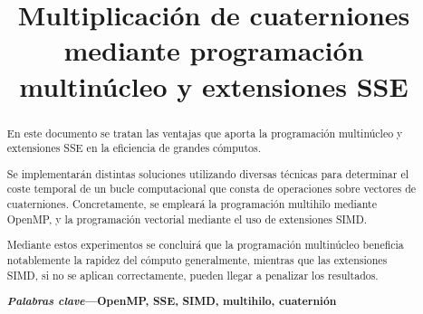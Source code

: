 \documentclass[conference]{IEEEtran}
\begin{document}
\def\UrlBreaks{\do\/\do-\do\_} %

\title{Multiplicación de cuaterniones mediante programación multinúcleo y extensiones SSE\\
}

\author{
\and
{}
}

\maketitle

\thispagestyle{plain}
\pagestyle{plain}

\begin{abstract}
En este documento se tratan las ventajas que aporta la programación multinúcleo y extensiones SSE en la eficiencia de grandes cómputos.

Se implementarán distintas soluciones utilizando diversas técnicas para determinar el coste temporal de un bucle computacional que consta de operaciones sobre vectores de cuaterniones. Concretamente, se empleará la programación multihilo mediante OpenMP, y la programación vectorial mediante el uso de extensiones SIMD.

Mediante estos experimentos se concluirá que la programación multinúcleo beneficia notablemente la rapidez del cómputo generalmente, mientras que las extensiones SIMD, si no se aplican correctamente, pueden llegar a penalizar los resultados.

\textbf{\textit{Palabras clave}---OpenMP, SSE, SIMD, multihilo, cuaternión}
\end{abstract}
\end{document}
